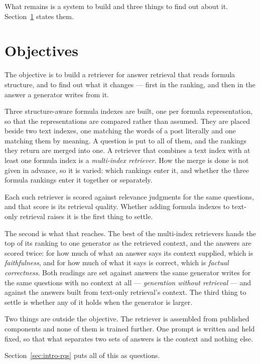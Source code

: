 What remains is a system to build and three things to find out about it.
Section~\ref{sec:intro-objectives} states them.

\section{Objectives}\label{sec:intro-objectives}

The objective is to build a retriever for answer retrieval that reads formula structure, and to find
out what it changes --- first in the ranking, and then in the answer a generator writes from it.

Three structure-aware formula indexes are built, one per formula representation, so that the
representations are compared rather than assumed. They are placed beside two text indexes, one
matching the words of a post literally and one matching them by meaning. A question is put to all of
them, and the rankings they return are merged into one. A retriever that combines a text index with
at least one formula index is a \emph{multi-index retriever}. How the merge is done is not given in
advance, so it is varied: which rankings enter it, and whether the three formula rankings enter it
together or separately.

Each such retriever is scored against relevance judgments for the same questions, and that score is
its retrieval quality. Whether adding formula indexes to text-only retrieval raises it is the first
thing to settle.

The second is what that reaches. The best of the multi-index retrievers hands the top of its ranking
to one generator as the retrieved context, and the answers are scored twice: for how much of what an
answer says its context supplied, which is \emph{faithfulness}, and for how much of what it says is
correct, which is \emph{factual correctness}. Both readings are set against answers the same
generator writes for the same questions with no context at all --- \emph{generation without
retrieval} --- and against the answers built from text-only retrieval's context. The third thing to
settle is whether any of it holds when the generator is larger.

Two things are outside the objective. The retriever is assembled from published components and none
of them is trained further. One prompt is written and held fixed, so that what separates two sets of
answers is the context and nothing else.

Section~\ref{sec:intro-rqs} puts all of this as questions.

